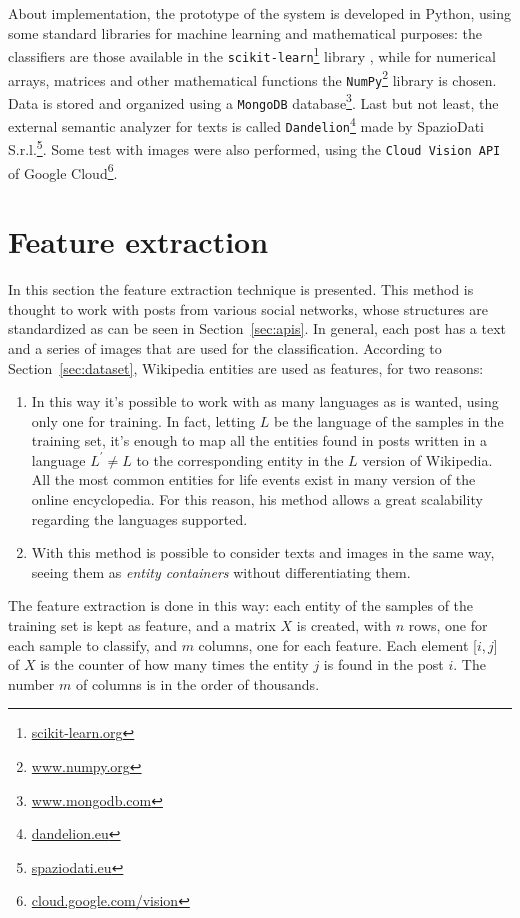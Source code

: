 About implementation, the prototype of the system is developed in Python, using some standard libraries for machine learning and mathematical purposes: the classifiers are those available in the \texttt{scikit-learn}\footnote{\url{scikit-learn.org}} library \cite{scikit-learn}, while for numerical arrays, matrices and other mathematical functions the \texttt{NumPy}\footnote{\url{www.numpy.org}} library \cite{oliphant2006guide} is chosen. Data is stored and organized using a \texttt{MongoDB} database\footnote{\url{www.mongodb.com}}. Last but not least, the external semantic analyzer for texts is called \texttt{Dandelion}\footnote{\url{dandelion.eu}} made by SpazioDati S.r.l.\footnote{\url{spaziodati.eu}}. Some test with images were also performed, using the \texttt{Cloud Vision API} of Google Cloud\footnote{\url{cloud.google.com/vision}}.

\section{Feature extraction}
\label{sec:featurextraction}
In this section the feature extraction technique is presented. This method is thought to work with posts from various social networks, whose structures are standardized as can be seen in Section~\ref{sec:apis}. In general, each post has a text and a series of images that are used for the classification. According to Section~\ref{sec:dataset}, Wikipedia entities are used as features, for two reasons:
\begin{enumerate}
\item In this way it's possible to work with as many languages as is wanted, using only one for training. In fact, letting $ L $ be the language of the samples in the training set, it's enough to map all the entities found in posts written in a language $ L^{'} \ne L $ to the corresponding entity in the $ L $ version of Wikipedia. All the most common entities for life events exist in many version of the online encyclopedia. For this reason, his method allows a great scalability regarding the languages supported.
\item With this method is possible to consider texts and images in the same way, seeing them as \emph{entity containers} without differentiating them.
\end{enumerate}

The feature extraction is done in this way: each entity of the samples of the training set is kept as feature, and a matrix $X$ is created, with $n$ rows, one for each sample to classify, and $m$ columns, one for each feature. Each element [$i,j$] of $X$ is the counter of how many times the entity $j$ is found in the post $i$. The number $m$ of columns is in the order of thousands.

